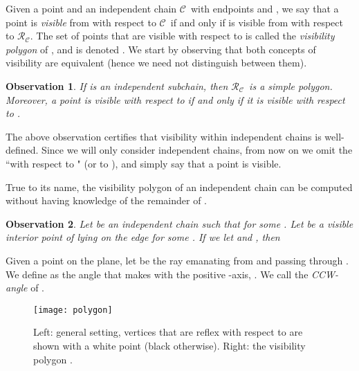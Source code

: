 \documentclass[a4paper]{article}
\newtheorem{observation}{Observation}
\newcommand{\regionC}{\ensuremath{{{\mathcal R_{\mathcal C}}}}}
\newcommand{\C}{\ensuremath{{\mathcal C}}}
\begin{document}
Given a point  and an independent chain \C\ with endpoints  and , we say that a point  is \emph{visible} from  with respect to \C\ if and only if  is visible from  with respect to \regionC.
The set of points that are visible with respect to  is called the \emph{visibility polygon} of , and is denoted \VisC. We start by observing that both concepts of visibility are equivalent (hence we need not distinguish between them).

\begin{observation}
If  is an independent subchain, then \regionC\ is a simple polygon. Moreover, a point  is visible with respect to  if and only if it is visible with respect to . 
\end{observation}

The above observation certifies that visibility within independent chains is well-defined. Since we will only consider independent chains, from now on we omit the ``with respect to " (or to ), and simply say that a point  is visible. 

True to its name, the visibility polygon of an independent chain  can be computed without having knowledge of the remainder of . 

\begin{observation}\label{DivideObs}
Let  be an independent chain such that  for some . Let  be a visible interior point of  lying on the edge  for some . If we let  and ,
then  

\end{observation}





Given a point  on the plane, let  be the ray emanating from  and passing through .
We define  as the angle that  makes with the positive -axis, . 
We call  the \emph{CCW-angle} of .








\begin{figure}[tb!]
\centering
\texttt{[image: polygon]}
\caption{Left:	general setting, vertices that are reflex with respect to  are shown with a white point (black otherwise). Right: the visibility polygon .
}
\label{fig:polygon}
\end{figure}
\end{document}
